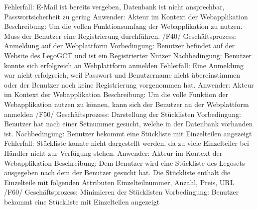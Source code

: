 Fehlerfall: E-Mail ist bereits vergeben, Datenbank ist nicht ansprechbar, Passwortsicherheit zu gering\newline
Anwender: Akteur im Kontext der Webapplikation\newline
Beschreibung: Um die vollen Funktionsumfang der Webapplikation zu nutzen. Muss der Benutzer eine Registrierung durchführen.\newline\newline
/F40/\newline
Geschäftsprozess: Anmeldung auf der Webplattform\newline
Vorbedingung: Benutzer befindet auf der Website des LegoGCT und ist ein Registrierter Nutzer\newline
Nachbedingung: Benutzer konnte sich erfolgreich an Webplattform anmelden\newline
Fehlerfall: Eine Anmeldung war nicht erfolgreich, weil Passwort und Benutzername nicht übereinstimmen oder der Benutzer noch keine Registrierung vorgenommen hat.\newline
Anwender: Akteur im Kontext der Webapplikation\newline
Beschreibung: Um die volle Funktion der Webapplikation nutzen zu können, kann sich der Benutzer an der Webplattform anmelden\newline\newline
/F50/\newline
Geschäftsprozess: Darstellung der Stücklisten\newline
Vorbedingung: Benutzer hat nach einer Setnummer gesucht, welche in der Datenbank vorhanden ist.\newline
Nachbedingung: Benutzer bekommt eine Stückliste mit Einzelteilen angezeigt \newline
Fehlerfall: Stückliste konnte nicht dargestellt werden, da zu viele Einzelteiler bei Händler nicht zur Verfügung stehen. \newline
Anwender: Akteur im Kontext der Webapplikation \newline
Beschreibung: Dem Benutzer wird eine Stückliste des Legosets ausgegeben nach dem der Benutzer gesucht hat. Die Stückliste enthält die Einzelteile mit folgenden Attributen Einzelteilnummer, Anzahl, Preis, URL \newline\newline
/F60/\newline
Geschäftsprozess: Minimieren der Stücklisten\newline
Vorbedingung: Benutzer bekommt eine Stückliste mit Einzelteilen angezeigt\newline
